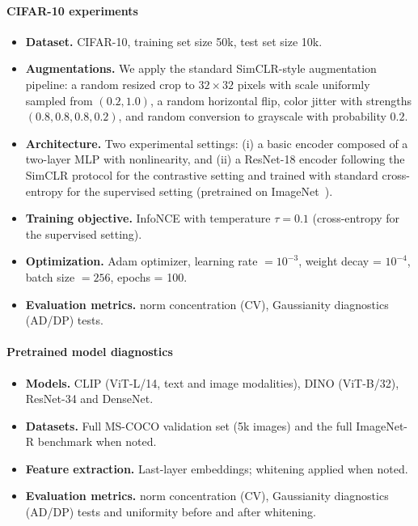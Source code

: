\documentclass{article}
\begin{document}
\paragraph{CIFAR-10 experiments}
\begin{itemize}
    \item \textbf{Dataset.} CIFAR-10, training set size 50k, test set size 10k.
    \item \textbf{Augmentations.} We apply the standard SimCLR-style augmentation pipeline: a random resized crop to $32\times32$ pixels with scale uniformly sampled from $(0.2,1.0)$, a random horizontal flip, color jitter with strengths $(0.8,0.8,0.8,0.2)$, and random conversion to grayscale with probability $0.2$.
    \item \textbf{Architecture.} Two experimental settings: (i) a basic encoder composed of a two-layer MLP with nonlinearity, and (ii) a ResNet-18 encoder following the SimCLR protocol for the contrastive setting and trained with standard cross-entropy for the supervised setting (pretrained on ImageNet~\citep{deng2009imagenet}).
    \item \textbf{Training objective.} InfoNCE with temperature $\tau= 0.1$ (cross-entropy for the supervised setting).
    \item \textbf{Optimization.} Adam optimizer, learning rate $= 10^{-3}$, weight decay = $10^{-4}$, batch size $= 256$, epochs = 100.
    \item \textbf{Evaluation metrics.}  norm concentration (CV), Gaussianity diagnostics (AD/DP) tests.
\end{itemize}

\paragraph{Pretrained model diagnostics}
\begin{itemize}
    \item \textbf{Models.} CLIP (ViT-L/14, text and image modalities), DINO (ViT-B/32), ResNet-34 and DenseNet.
    \item \textbf{Datasets.} Full MS-COCO validation set (5k images) and the full ImageNet-R benchmark when noted.
    \item \textbf{Feature extraction.} Last-layer embeddings; whitening applied when noted.
    \item \textbf{Evaluation metrics.}  norm concentration (CV), Gaussianity diagnostics (AD/DP) tests and uniformity before and after whitening.
\end{itemize}
\end{document}
